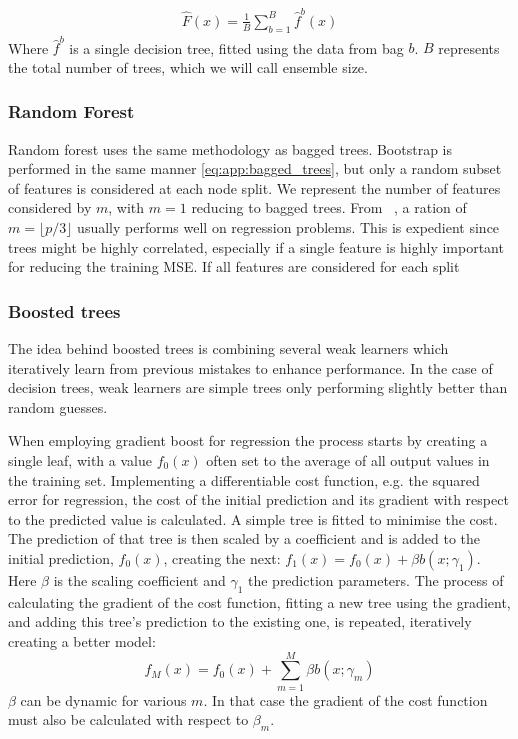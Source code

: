             \begin{align}
                \hat{F}(x) = \frac{1}{B}\sum_{b = 1}^{B} \hat{f}^b (x) \label{eq:app:bagged_trees}
            \end{align}
            Where $\hat{f}^b$ is a single decision tree, fitted using the data from bag $b$. $B$ represents the total number of trees, which we will call ensemble size.

            \subsubsection{Random Forest}
            Random forest uses the same methodology as bagged trees. Bootstrap is performed in the same manner \cref{eq:app:bagged_trees}, but only a random subset of features is considered at each node split. We represent the number of features considered by $m$, with $m = 1$ reducing to bagged trees. From ~\citep{hastie01statisticallearning}, a ration of $m = \lfloor p/3 \rfloor$ usually performs well on regression problems. This is expedient since trees might be highly correlated, especially if a single feature is highly important for reducing the training MSE. If all features are considered for each split 
            
            \subsubsection{Boosted trees}
                The idea behind boosted trees is combining several weak learners which iteratively learn from previous mistakes to enhance performance. In the case of decision trees, weak learners are simple trees only performing slightly better than random guesses. 

                When employing gradient boost for regression the process starts by creating a single leaf, with a value $f_0(x)$ often set to the average of all output values in the training set. Implementing a differentiable cost function, e.g. the squared error for regression, the cost of the initial prediction and its gradient with respect to the predicted value is calculated. A simple tree is fitted to minimise the cost. The prediction of that tree is then scaled by a coefficient and is added to the initial prediction, $f_0(x)$, creating the next: $f_1(x) = f_0(x) + \beta b(x;\gamma_1)$. Here $\beta$ is the scaling coefficient and $\gamma_1$ the prediction parameters. The process of calculating the gradient of the cost function, fitting a new tree using the gradient, and adding this tree's prediction to the existing one, is repeated, iteratively creating a better model: 
                \begin{equation}
                    f_M(x) = f_0(x) + \sum_{m=1}^M \beta b(x; \gamma_m)
                \end{equation}
                $\beta$ can be dynamic for various $m$. In that case the gradient of the cost function must also be calculated with respect to $\beta_m$. 


